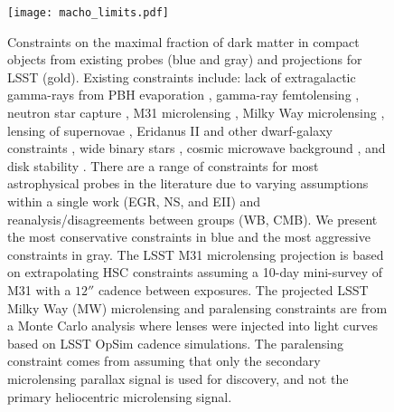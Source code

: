\begin{figure}[t]
\centering
\texttt{[image: macho\_limits.pdf]}
\caption{\label{fig:macho_constraints}
    Constraints on the maximal fraction of dark matter in compact objects from existing probes (blue and gray) and projections for LSST (gold).
    Existing constraints include: lack of extragalactic gamma-rays from PBH evaporation \citep[EGR;][]{0912.5297, 1604.05349}, gamma-ray femtolensing \citep[GF;][]{1204.2056}, neutron star capture \citep[NS][]{1301.4984}, M31 microlensing \citep[M31ML][]{1701.02151}, Milky Way microlensing \citep[MWML;][]{2007A&A...469..387T, 2001ApJ...550L.169A, 2009MNRAS.397.1228W}, lensing of supernovae \citep[LSN;][]{1712.02240,1712.06574}, Eridanus II and other dwarf-galaxy constraints \citep[EII;][]{2016ApJ...824L..31B, 1611.05052}, wide binary stars \citep[WB;][]{2009MNRAS.396L..11Q, 2004ApJ...601..311Y}, cosmic microwave background \citep[CMB;][]{2017PhRvD..95d3534A, 2008ApJ...680..829R}, and disk stability \citep[DS;][]{1985ApJ...299..633L, 1994ApJ...437..184X}.
    There are a range of constraints for most astrophysical probes in the literature due to varying assumptions within a single work (EGR, NS, and EII) and reanalysis/disagreements between groups (WB, CMB).
    We present the most conservative constraints in blue and the most aggressive constraints in gray.
    The LSST M31 microlensing projection is based on extrapolating HSC constraints \citep{1701.02151} assuming a 10-day mini-survey of M31 with a $12\second$ cadence between exposures.
    The projected LSST Milky Way (MW) microlensing and paralensing constraints are from a Monte Carlo analysis where lenses were injected into light curves based on LSST OpSim cadence simulations. 
    The paralensing constraint comes from assuming that only the secondary microlensing parallax signal is used for discovery, and not the primary heliocentric microlensing signal.
}
\end{figure}

